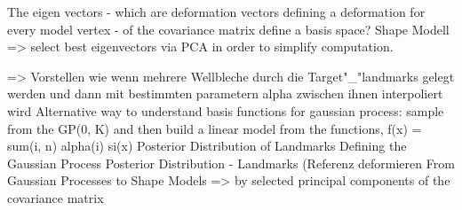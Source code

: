 The eigen vectors - which are deformation vectors defining a deformation for every model vertex - of the covariance matrix define a basis space? 
Shape Modell => select best eigenvectors via PCA in order to simplify computation.

=> Vorstellen wie wenn mehrere Wellbleche durch die Target"\_"landmarks gelegt werden und dann mit bestimmten parametern alpha zwischen ihnen interpoliert wird
Alternative way to understand basis functions for gaussian process:
sample from the GP(0, K)
and then build a linear model from the functions, f(x) = sum(i, n) alpha(i) si(x)
Posterior Distribution of Landmarks
Defining the Gaussian Process
Posterior Distribution - Landmarks (Referenz deformieren 
From Gaussian Processes to Shape Models => by selected principal components of the covariance matrix

